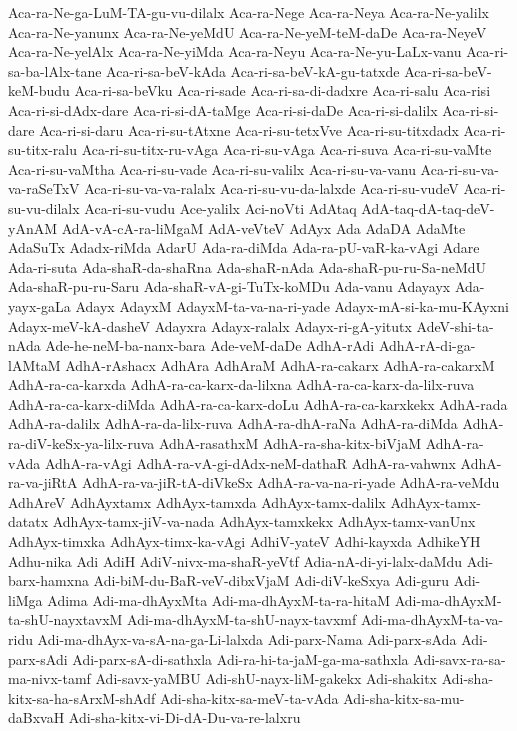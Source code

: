 {Aca-ra-Ne-ga-LuM-TA-gu-vu-dilalx
Aca-ra-Nege
Aca-ra-Neya
Aca-ra-Ne-yalilx
Aca-ra-Ne-yanunx
Aca-ra-Ne-yeMdU
Aca-ra-Ne-yeM-teM-daDe
Aca-ra-NeyeV
Aca-ra-Ne-yelAlx
Aca-ra-Ne-yiMda
Aca-ra-Neyu
Aca-ra-Ne-yu-LaLx-vanu
Aca-ri-sa-ba-lAlx-tane
Aca-ri-sa-beV-kAda
Aca-ri-sa-beV-kA-gu-tatxde
Aca-ri-sa-beV-keM-budu
Aca-ri-sa-beVku
Aca-ri-sade
Aca-ri-sa-di-dadxre
Aca-ri-salu
Aca-risi
Aca-ri-si-dAdx-dare
Aca-ri-si-dA-taMge
Aca-ri-si-daDe
Aca-ri-si-dalilx
Aca-ri-si-dare
Aca-ri-si-daru
Aca-ri-su-tAtxne
Aca-ri-su-tetxVve
Aca-ri-su-titxdadx
Aca-ri-su-titx-ralu
Aca-ri-su-titx-ru-vAga
Aca-ri-su-vAga
Aca-ri-suva
Aca-ri-su-vaMte
Aca-ri-su-vaMtha
Aca-ri-su-vade
Aca-ri-su-valilx
Aca-ri-su-va-vanu
Aca-ri-su-va-va-raSeTxV
Aca-ri-su-va-va-ralalx
Aca-ri-su-vu-da-lalxde
Aca-ri-su-vudeV
Aca-ri-su-vu-dilalx
Aca-ri-su-vudu
Ace-yalilx
Aci-noVti
AdAtaq
AdA-taq-dA-taq-deV-yAnAM
AdA-vA-cA-ra-liMgaM
AdA-veVteV
AdAyx
Ada
AdaDA
AdaMte
AdaSuTx
Adadx-riMda
AdarU
Ada-ra-diMda
Ada-ra-pU-vaR-ka-vAgi
Adare
Ada-ri-suta
Ada-shaR-da-shaRna
Ada-shaR-nAda
Ada-shaR-pu-ru-Sa-neMdU
Ada-shaR-pu-ru-Saru
Ada-shaR-vA-gi-TuTx-koMDu
Ada-vanu
Adayayx
Ada-yayx-gaLa
Adayx
AdayxM
AdayxM-ta-va-na-ri-yade
Adayx-mA-si-ka-mu-KAyxni
Adayx-meV-kA-dasheV
Adayxra
Adayx-ralalx
Adayx-ri-gA-yitutx
AdeV-shi-ta-nAda
Ade-he-neM-ba-nanx-bara
Ade-veM-daDe
AdhA-rAdi
AdhA-rA-di-ga-lAMtaM
AdhA-rAshacx
AdhAra
AdhAraM
AdhA-ra-cakarx
AdhA-ra-cakarxM
AdhA-ra-ca-karxda
AdhA-ra-ca-karx-da-lilxna
AdhA-ra-ca-karx-da-lilx-ruva
AdhA-ra-ca-karx-diMda
AdhA-ra-ca-karx-doLu
AdhA-ra-ca-karxkekx
AdhA-rada
AdhA-ra-dalilx
AdhA-ra-da-lilx-ruva
AdhA-ra-dhA-raNa
AdhA-ra-diMda
AdhA-ra-diV-keSx-ya-lilx-ruva
AdhA-rasathxM
AdhA-ra-sha-kitx-biVjaM
AdhA-ra-vAda
AdhA-ra-vAgi
AdhA-ra-vA-gi-dAdx-neM-dathaR
AdhA-ra-vahwnx
AdhA-ra-va-jiRtA
AdhA-ra-va-jiR-tA-diVkeSx
AdhA-ra-va-na-ri-yade
AdhA-ra-veMdu
AdhAreV
AdhAyxtamx
AdhAyx-tamxda
AdhAyx-tamx-dalilx
AdhAyx-tamx-datatx
AdhAyx-tamx-jiV-va-nada
AdhAyx-tamxkekx
AdhAyx-tamx-vanUnx
AdhAyx-timxka
AdhAyx-timx-ka-vAgi
AdhiV-yateV
Adhi-kayxda
AdhikeYH
Adhu-nika
Adi
AdiH
AdiV-nivx-ma-shaR-yeVtf
Adia-nA-di-yi-lalx-daMdu
Adi-barx-hamxna
Adi-biM-du-BaR-veV-dibxVjaM
Adi-diV-keSxya
Adi-guru
Adi-liMga
Adima
Adi-ma-dhAyxMta
Adi-ma-dhAyxM-ta-ra-hitaM
Adi-ma-dhAyxM-ta-shU-nayxtavxM
Adi-ma-dhAyxM-ta-shU-nayx-tavxmf
Adi-ma-dhAyxM-ta-va-ridu
Adi-ma-dhAyx-va-sA-na-ga-Li-lalxda
Adi-parx-Nama
Adi-parx-sAda
Adi-parx-sAdi
Adi-parx-sA-di-sathxla
Adi-ra-hi-ta-jaM-ga-ma-sathxla
Adi-savx-ra-sa-ma-nivx-tamf
Adi-savx-yaMBU
Adi-shU-nayx-liM-gakekx
Adi-shakitx
Adi-sha-kitx-sa-ha-sArxM-shAdf
Adi-sha-kitx-sa-meV-ta-vAda
Adi-sha-kitx-sa-mu-daBxvaH
Adi-sha-kitx-vi-Di-dA-Du-va-re-lalxru
}

